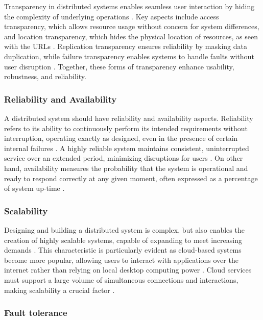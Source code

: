 Transparency in distributed systems enables seamless user interaction by hiding the complexity of underlying operations \cite{Tanenbaum2023, Ledmi2018}. Key aspects include access transparency, which allows resource usage without concern for system differences, and location transparency, which hides the physical location of resources, as seen with the \glspl{URL} \cite{Tanenbaum2023, Coulouris2012}. Replication transparency ensures reliability by masking data duplication, while failure transparency enables systems to handle faults without user disruption \cite{Tanenbaum2023, Coulouris2012}. Together, these forms of transparency enhance usability, robustness, and reliability.

\subsubsection{Reliability and Availability}

A distributed system should have reliability and availability aspects. Reliability refers to its ability to continuously perform its intended requirements without interruption, operating exactly as designed, even in the presence of certain internal failures \cite{Ahmed2013}. A highly reliable system maintains consistent, uninterrupted service over an extended period, minimizing disruptions for users \cite{Tanenbaum2023}. On other hand, availability measures the probability that the system is operational and ready to respond correctly at any given moment, often expressed as a percentage of system up-time \cite{Tanenbaum2023, atlassian-availability}.

\subsubsection{Scalability}

Designing and building a distributed system is complex, but also enables the creation of highly scalable systems, capable of expanding to meet increasing demands \cite{Tanenbaum2023, Vitillo2021, Valkov2018}. This characteristic is particularly evident as cloud-based systems become more popular, allowing users to interact with applications over the internet rather than relying on local desktop computing power \cite{Lindsay2021}. Cloud services must support a large volume of simultaneous connections and interactions, making scalability a crucial factor \cite{Tanenbaum2023}.

\subsubsection{Fault tolerance}

